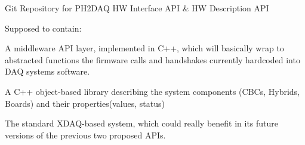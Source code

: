 Git Repository for P\-H2\-D\-A\-Q H\-W Interface A\-P\-I \& H\-W Description A\-P\-I

Supposed to contain\-:


\begin{DoxyItemize}
\item A middleware A\-P\-I layer, implemented in C++, which will basically wrap to abstracted functions the firmware calls and handshakes currently hardcoded into D\-A\-Q systems software.
\item A C++ object-\/based library describing the system components (C\-B\-Cs, Hybrids, Boards) and their properties(values, status)
\item The standard X\-D\-A\-Q-\/based system, which could really benefit in its future versions of the previous two proposed A\-P\-Is. 
\end{DoxyItemize}